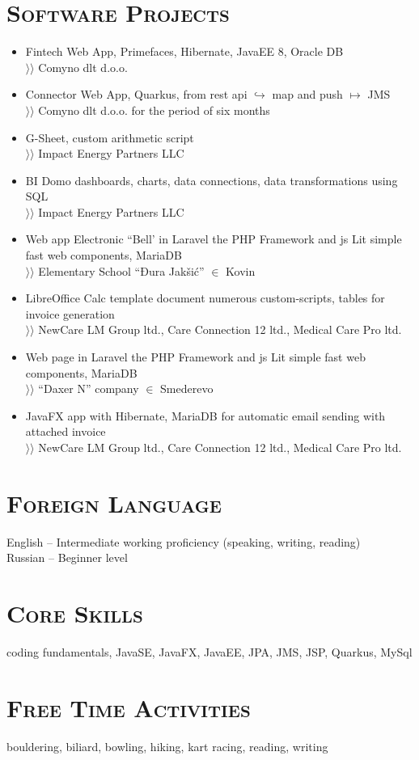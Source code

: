 \documentclass{article}
\begin{document}
\section{\textsc{Software Projects}}

\begin{itemize}
\item  Fintech Web App, Primefaces, Hibernate, JavaEE 8, Oracle DB\\
$\rangle\!\rangle$ Comyno dlt d.o.o.
\item Connector Web App, Quarkus, from rest api $\hookrightarrow$ map and push $\mapsto$ JMS\\
$\rangle\!\rangle$ Comyno dlt d.o.o. for the period of six months
\item G-Sheet, custom arithmetic script\\
$\rangle\!\rangle$ Impact Energy Partners LLC
\item BI Domo dashboards, charts, data connections, data transformations using SQL\\
$\rangle\!\rangle$ Impact Energy Partners LLC
\item Web app Electronic ``Bell' in Laravel the PHP Framework and js Lit simple fast web components, MariaDB\\
$\rangle\!\rangle$ Elementary School ``Đura Jakšić'' $\in$ Kovin
\item LibreOffice Calc template document numerous custom-scripts, tables for invoice generation\\ 
$\rangle\!\rangle$ NewCare LM Group ltd., Care Connection 12 ltd., Medical Care Pro ltd.
\item Web page in Laravel the PHP Framework and js Lit simple fast web components, MariaDB\\
$\rangle\!\rangle$ ``Daxer N'' company $\in$ Smederevo
\item JavaFX app with Hibernate, MariaDB for automatic email sending with attached invoice\\
$\rangle\!\rangle$ NewCare LM Group ltd., Care Connection 12 ltd., Medical Care Pro ltd.
\end{itemize}

\section{\textsc{Foreign Language}}

English  -- Intermediate working proficiency (speaking, writing, reading)\\
Russian -- Beginner level

\section{\textsc{Core Skills}}

coding fundamentals, JavaSE, JavaFX, JavaEE, JPA, JMS, JSP,  Quarkus, MySql

\section{\textsc{Free Time Activities}}

bouldering, biliard, bowling, hiking, kart racing, reading, writing
\end{document}
